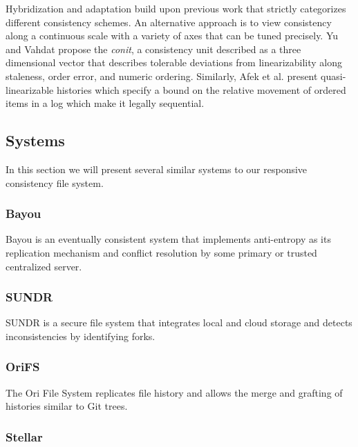 \documentclass{article}
\begin{document}
Hybridization and adaptation build upon previous work that strictly categorizes different consistency schemes. An alternative approach is to view consistency along a continuous scale with a variety of axes that can be tuned precisely. Yu and Vahdat \cite{yu_design_2002} propose the \textit{conit}, a consistency unit described as a three dimensional vector that describes tolerable deviations from linearizability along staleness, order error, and numeric ordering. Similarly, Afek et al. \cite{afek_quasi-linearizability:_2010} present quasi-linearizable histories which specify a bound on the relative movement of ordered items in a log which make it legally sequential.

\subsection{Systems}

In this section we will present several similar systems to our responsive consistency file system.

\subsubsection{Bayou}

Bayou \cite{terry_managing_1995,terry_session_1994} is an eventually consistent system that implements anti-entropy as its replication mechanism and conflict resolution by some primary or trusted centralized server.

\subsubsection{SUNDR}

SUNDR \cite{li_secure_2004} is a secure file system that integrates local and cloud storage and detects inconsistencies by identifying forks.

\subsubsection{OriFS}

The Ori File System \cite{mashtizadeh_replication_2013} replicates file history and allows the merge and grafting of histories similar to Git trees.

\subsubsection{Stellar}
\end{document}
